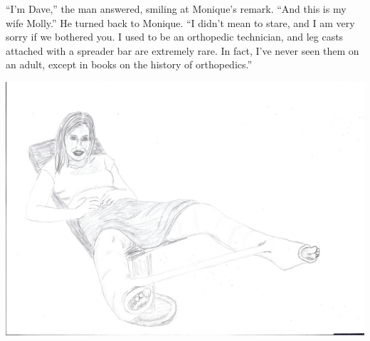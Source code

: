 ``I'm Dave,'' the man answered, smiling at Monique's remark. ``And this is my wife Molly.'' He
turned back to Monique. ``I didn't mean to stare, and I am very sorry if we bothered you. I used
to be an orthopedic technician, and leg casts attached with a spreader bar are extremely rare.
In fact, I've never seen them on an adult, except in books on the history of orthopedics.''

\newpage
\begin{center}
\includegraphics[width=\textwidth]{images/kicks43.jpg}
\end{center}
